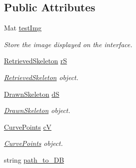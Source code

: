 \subsection*{\-Public \-Attributes}
\begin{DoxyCompactItemize}
\item 
\hypertarget{classScribbleArea_a03e231e370dcc36fe0c48c577c52796f}{\-Mat \hyperlink{classScribbleArea_a03e231e370dcc36fe0c48c577c52796f}{test\-Img}}\label{classScribbleArea_a03e231e370dcc36fe0c48c577c52796f}

\begin{DoxyCompactList}\small\item\em \-Store the image displayed on the interface. \end{DoxyCompactList}\item 
\hypertarget{classScribbleArea_a21b17b49e377c8218494370f89efbbe4}{\hyperlink{classRetrievedSkeleton}{\-Retrieved\-Skeleton} \hyperlink{classScribbleArea_a21b17b49e377c8218494370f89efbbe4}{r\-S}}\label{classScribbleArea_a21b17b49e377c8218494370f89efbbe4}

\begin{DoxyCompactList}\small\item\em \hyperlink{classRetrievedSkeleton}{\-Retrieved\-Skeleton} object. \end{DoxyCompactList}\item 
\hypertarget{classScribbleArea_aea18d75006dec038f4a7927d902815fd}{\hyperlink{classDrawnSkeleton}{\-Drawn\-Skeleton} \hyperlink{classScribbleArea_aea18d75006dec038f4a7927d902815fd}{d\-S}}\label{classScribbleArea_aea18d75006dec038f4a7927d902815fd}

\begin{DoxyCompactList}\small\item\em \hyperlink{classDrawnSkeleton}{\-Drawn\-Skeleton} object. \end{DoxyCompactList}\item 
\hypertarget{classScribbleArea_aa5b6a8f216d13730c575035afca482bf}{\hyperlink{classCurvePoints}{\-Curve\-Points} \hyperlink{classScribbleArea_aa5b6a8f216d13730c575035afca482bf}{c\-V}}\label{classScribbleArea_aa5b6a8f216d13730c575035afca482bf}

\begin{DoxyCompactList}\small\item\em \hyperlink{classCurvePoints}{\-Curve\-Points} object. \end{DoxyCompactList}\item 
\hypertarget{classScribbleArea_ab99e740812a227bd35b68d3ef97ee3f5}{string \hyperlink{classScribbleArea_ab99e740812a227bd35b68d3ef97ee3f5}{path\-\_\-to\-\_\-\-D\-B}}\label{classScribbleArea_ab99e740812a227bd35b68d3ef97ee3f5}


\end{DoxyCompactItemize}
